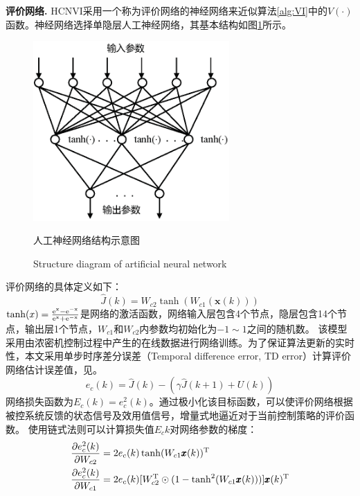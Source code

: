 {\bf 评价网络. }
  HCNVI采用一个称为评价网络的神经网络来近似算法\ref{alg:VI}中的$V(\cdot)$函数。神经网络选择单隐层人工神经网络，其基本结构如图\ref{fig:nn_structure}所示。
  \begin{figure}[!ht]
    \centering
    \includegraphics[width=7.5cm]{figures/chapter6/fig3.eps}
    \caption{人工神经网络结构示意图}

  \addtocounter{figure}{-1}
  \vspace{-5pt}
  \renewcommand{\figurename}{Fig.}
  \caption{Structure diagram of artificial neural network}
  \renewcommand{\figurename}{图}

    \label{fig:nn_structure}
\end{figure}
  评价网络的具体定义如下：
\begin{equation}
\label{equ:criticNN} \hat { J } ( k ) = W _ { c 2 } \tanh \left( W _
{ c 1 } ( \pmb x ( k ) ) \right)
\end{equation}
$\tanh(x)=\frac{\rm e^{x}-\rm e^{-x}}{\rm e^{x}+\rm
e^{-x}}$是网络的激活函数，网络输入层包含4个节点，隐层包含14个节点，输出层1个节点$，
W _ { c 1 }$和$ W _ { c 2 }$内参数均初始化为$-1\sim 1$之间的随机数。
该模型采用由浓密机控制过程中产生的在线数据进行网络训练。为了保证算法更新的实时性，本文采用单步时序差分误差（Temporal
difference error, TD
error）\cite{Sutton2018}计算评价网络估计误差值，见。
\begin{equation}
\label{equ:TDerror} e_{c }(k)=\hat{J}(k)-(\gamma \hat{J}(k+1)+U(k))
\end{equation}
网络损失函数为$E_c(k)=e_c^2(k)$。通过极小化该目标函数，可以使评价网络根据被控系统反馈的状态信号及效用值信号，增量式地逼近对于当前控制策略的评价函数。
使用链式法则可以计算损失值$E_c{k}$对网络参数的梯度：
\begin{equation}
\begin{aligned}
\label{equ:critic_gradient} \dfrac{\partial e_c^2(k)}{\partial
W_{c2}} & =2e_c(k) \tanh(W_{c1}\pmb x(k))^{\rm T} \\ \dfrac{\partial
e_c^2(k)}{\partial W_{c1}} & =2e_c(k) [W_{c2}^{\rm
T}\odot(1-\tanh^2(W_{c1}\pmb x(k)))]\pmb x(k)^{\rm T}
\end{aligned}
\end{equation}

